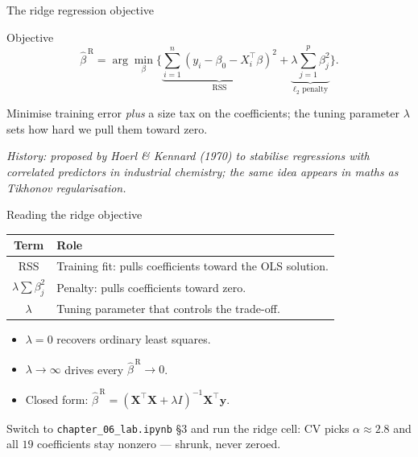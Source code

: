 \documentclass[aspectratio=169,11pt]{beamer}
\begin{document}
\begin{frame}{The ridge regression objective}
  \begin{block}{Objective}
    \[
      \boxed{\;
        \hat\beta^{\,\mathrm R} = \arg\min_{\beta}
        \biggl\{ \underbrace{\sum_{i=1}^n (y_i - \beta_0 - X_i^\top\beta)^2}_{\mathrm{RSS}}
                + \underbrace{\lambda \sum_{j=1}^p \beta_j^2}_{\ell_2 \text{ penalty}} \biggr\}.
      \;}
    \]
  \end{block}
  \begin{takeaway}
    Minimise training error \emph{plus} a size tax on the coefficients;
    the tuning parameter $\lambda$ sets how hard we pull them toward
    zero.
  \end{takeaway}
  \par{\tiny\itshape\color{gray}History: proposed by Hoerl \& Kennard
  (1970) to stabilise regressions with correlated predictors in industrial
  chemistry; the same idea appears in maths as Tikhonov regularisation.}
\end{frame}

\begin{frame}{Reading the ridge objective}\label{frm:ridgeobj}
  \begin{readme}
    \begin{tabular}{@{}cl@{}}
      \toprule
      \textbf{Term} & \textbf{Role} \\
      \midrule
      RSS & Training fit: pulls coefficients toward the OLS solution. \\
      $\lambda \sum \beta_j^2$ & Penalty: pulls coefficients toward zero. \\
      $\lambda$ & Tuning parameter that controls the trade-off. \\
      \bottomrule
    \end{tabular}
  \end{readme}
  \begin{itemize}
    \item $\lambda = 0$ recovers ordinary least squares.
    \item $\lambda \to \infty$ drives every $\hat\beta^{\,\mathrm R} \to 0$.
    \item Closed form:
          $\hat\beta^{\,\mathrm R} = (\mathbf{X}^\top \mathbf{X} + \lambda I)^{-1}\mathbf{X}^\top \mathbf{y}$.
  \end{itemize}
  \begin{labnote}
    Switch to \texttt{chapter\_06\_lab.ipynb} \S3 and run the ridge cell: CV picks
    $\alpha \approx 2.8$ and all $19$ coefficients stay nonzero --- shrunk, never zeroed.
  \end{labnote}
\end{frame}
\end{document}
